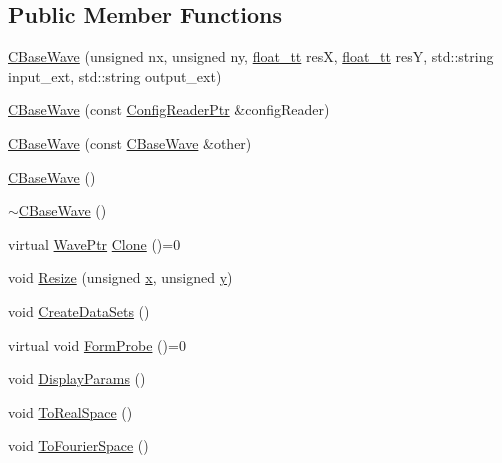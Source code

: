 \subsection*{Public Member Functions}
\begin{DoxyCompactItemize}
\item 
\hyperlink{class_q_s_t_e_m_1_1_c_base_wave_a469e2678ee924d7f374be81118489b7a}{C\-Base\-Wave} (unsigned nx, unsigned ny, \hyperlink{namespace_q_s_t_e_m_a915d7caa497280d9f927c4ce8d330e47}{float\-\_\-tt} res\-X, \hyperlink{namespace_q_s_t_e_m_a915d7caa497280d9f927c4ce8d330e47}{float\-\_\-tt} res\-Y, std\-::string input\-\_\-ext, std\-::string output\-\_\-ext)
\item 
\hyperlink{class_q_s_t_e_m_1_1_c_base_wave_a5e984874fd974666068c7d8b8361a5c5}{C\-Base\-Wave} (const \hyperlink{namespace_q_s_t_e_m_af9424707fe9f6503298f49b41304bd35}{Config\-Reader\-Ptr} \&config\-Reader)
\item 
\hyperlink{class_q_s_t_e_m_1_1_c_base_wave_a28488d5701163f1c9b05f0d0385f5a85}{C\-Base\-Wave} (const \hyperlink{class_q_s_t_e_m_1_1_c_base_wave}{C\-Base\-Wave} \&other)
\item 
\hyperlink{class_q_s_t_e_m_1_1_c_base_wave_ac1ff318347d5c5c15f9f206ae13f741d}{C\-Base\-Wave} ()
\item 
\hyperlink{class_q_s_t_e_m_1_1_c_base_wave_aa94b56e1c2292388c315bf2944fe3bea}{$\sim$\-C\-Base\-Wave} ()
\item 
virtual \hyperlink{namespace_q_s_t_e_m_ab42c5fe058973736465964e84b504b74}{Wave\-Ptr} \hyperlink{class_q_s_t_e_m_1_1_c_base_wave_a8eb38c8355451380f9cb08f56eddbe79}{Clone} ()=0
\item 
void \hyperlink{class_q_s_t_e_m_1_1_c_base_wave_afdb0df16a82b2368df4a305d6359374e}{Resize} (unsigned \hyperlink{_read_d_m3___matlab_8m_a9336ebf25087d91c818ee6e9ec29f8c1}{x}, unsigned \hyperlink{qmb_8m_a2fb1c5cf58867b5bbc9a1b145a86f3a0}{y})
\item 
void \hyperlink{class_q_s_t_e_m_1_1_c_base_wave_a64828910b6c68bbd81517bde1551bfcc}{Create\-Data\-Sets} ()
\item 
virtual void \hyperlink{class_q_s_t_e_m_1_1_c_base_wave_a0685004c0de2182187a33d76edf8d583}{Form\-Probe} ()=0
\item 
void \hyperlink{class_q_s_t_e_m_1_1_c_base_wave_aff9612fc5a55a7aadcfda9ee9845a4f0}{Display\-Params} ()
\item 
void \hyperlink{class_q_s_t_e_m_1_1_c_base_wave_a910defcca0f4b4dd702153d23289a4fc}{To\-Real\-Space} ()
\item 
void \hyperlink{class_q_s_t_e_m_1_1_c_base_wave_ab90ff6292a9cc06d869c6e0f4c0ecb0c}{To\-Fourier\-Space} ()

\end{DoxyCompactItemize}
